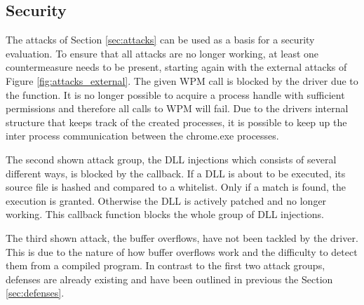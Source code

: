 \subsection{Security}
The attacks of Section \ref{sec:attacks} can be used as a basis for a security evaluation. To ensure that all attacks are no longer working, at least one countermeasure needs to be present, starting again with the external attacks of Figure \ref{fig:attacks_external}. The given \gls{WPM} call is blocked by the driver due to the  function. It is no longer possible to acquire a process handle with sufficient permissions and therefore all calls to \gls{WPM} will fail. Due to the drivers internal structure that keeps track of the created processes, it is possible to keep up the inter process communication between the chrome.exe processes. 

The second shown attack group, the \gls{DLL} injections which consists of several different ways, is blocked by the  callback. If a \gls{DLL} is about to be executed, its source file is hashed and compared to a whitelist. Only if a match is found, the execution is granted. Otherwise the \gls{DLL} is actively patched and no longer working. This callback function blocks the whole group of \gls{DLL} injections.

The third shown attack, the buffer overflows, have not been tackled by the driver. This is due to the nature of how buffer overflows work and the difficulty to detect them from a compiled program. In contrast to the first two attack groups, defenses are already existing and have been outlined in previous the Section \ref{sec:defenses}.

